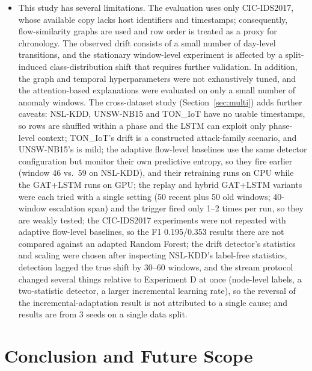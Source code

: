 \documentclass[twocolumn]{llncs}
\begin{document}
\begin{itemize}[nosep]
\item This study has several limitations. The evaluation uses only CIC-IDS2017, whose available copy lacks host identifiers and timestamps; consequently, flow-similarity graphs are used and row order is treated as a proxy for chronology. The observed drift consists of a small number of day-level transitions, and the stationary window-level experiment is affected by a split-induced class-distribution shift that requires further validation. In addition, the graph and temporal hyperparameters were not exhaustively tuned, and the attention-based explanations were evaluated on only a small number of anomaly windows. The cross-dataset study (Section~\ref{sec:multi}) adds further caveats: NSL-KDD, UNSW-NB15 and TON\_IoT have no usable timestamps, so rows are shuffled within a phase and the LSTM can exploit only phase-level context; TON\_IoT's drift is a constructed attack-family scenario, and UNSW-NB15's is mild; the adaptive flow-level baselines use the same detector configuration but monitor their own predictive entropy, so they fire earlier (window 46 vs.\ 59 on NSL-KDD), and their retraining runs on CPU while the GAT+LSTM runs on GPU; the replay and hybrid GAT+LSTM variants were each tried with a single setting (50 recent plus 50 old windows; 40-window escalation span) and the trigger fired only 1--2 times per run, so they are weakly tested; the CIC-IDS2017 experiments were not repeated with adaptive flow-level baselines, so the F1 0.195/0.353 results there are not compared against an adapted Random Forest; the drift detector's statistics and scaling were chosen after inspecting NSL-KDD's label-free statistics, detection lagged the true shift by 30--60 windows, and the stream protocol changed several things relative to Experiment D at once (node-level labels, a two-statistic detector, a larger incremental learning rate), so the reversal of the incremental-adaptation result is not attributed to a single cause; and results are from 3 seeds on a single data split.
\end{itemize}

\section{Conclusion and Future Scope}
\label{sec:conclusion}
\end{document}
